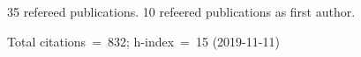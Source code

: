 35 refereed publications. 10 refeered publications as first author.

Total citations~=~832; h-index~=~15 (2019-11-11)
